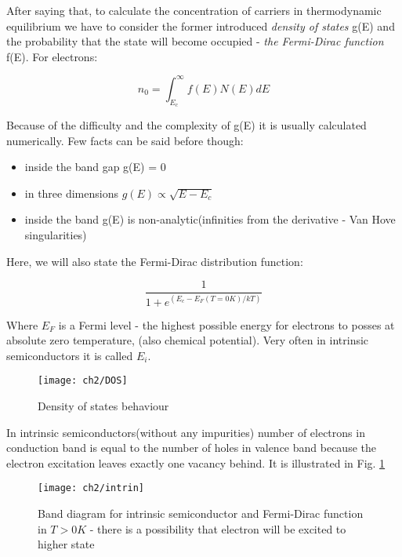 After saying that, to calculate the concentration of carriers in thermodynamic equilibrium we have to consider the former introduced \textit{density of states} g(E) and the probability that the state will become occupied - \textit{the Fermi-Dirac function} f(E). For electrons:

\begin{equation}
n_0 = \int _{E_c}^\infty f(E)N(E)dE
\end{equation}

Because of the difficulty and the complexity of g(E) it is usually calculated numerically. Few facts can be said before though:

\begin{itemize}
\item inside the band gap g(E) = 0
\item in three dimensions $g(E) \propto \sqrt{E-E_c}$
\item inside the band g(E) is non-analytic(infinities from the derivative - Van Hove singularities) 
\end{itemize}

Here, we will also state the Fermi-Dirac distribution function:

\begin{equation}
\frac{1}{1+e^{(E_c-E_F(T=0K)/kT)}}
\end{equation}

Where $E_F$ is a Fermi level - the highest possible energy for electrons to posses at absolute zero temperature, (also chemical potential). Very often in intrinsic semiconductors it is called $E_i$.

\begin{figure}
\centering
\texttt{[image: ch2/DOS]}
\caption{Density of states behaviour\cite{DOS}}
\end{figure}

In intrinsic semiconductors(without any impurities) number of electrons in conduction band is equal to the number of holes in valence band because the electron excitation leaves exactly one vacancy behind. It is illustrated in Fig. \ref{intrin}

\begin{figure}
\centering 
\texttt{[image: ch2/intrin]}
\caption{Band diagram for intrinsic semiconductor and Fermi-Dirac function in $T>0K$ - there is a possibility that electron will be excited to higher state \cite{popko}}
\label{intrin}
\end{figure}

